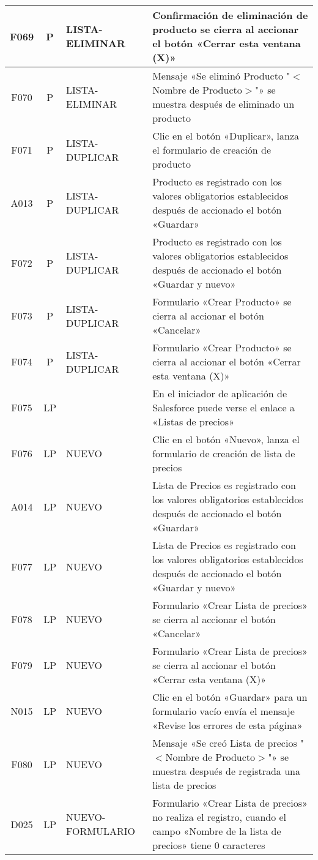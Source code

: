 \begin{landscape}
{\begin{longtable}[htb]{|c|c|p{5.0cm}|p{14.0cm}|}
F069 & P & LISTA-ELIMINAR & Confirmación de eliminación de producto se cierra al accionar el botón «Cerrar esta ventana (X)» \\ \hline
F070 & P & LISTA-ELIMINAR & Mensaje «Se eliminó Producto "$<$Nombre de Producto$>$"» se muestra después de eliminado un producto \\ \hline
F071 & P & LISTA-DUPLICAR & Clic en el botón «Duplicar», lanza el formulario de creación de producto \\ \hline
A013 & P & LISTA-DUPLICAR & Producto es registrado con los valores obligatorios establecidos después de accionado el botón «Guardar» \\ \hline
F072 & P & LISTA-DUPLICAR & Producto es registrado con los valores obligatorios establecidos después de accionado el botón «Guardar y nuevo» \\ \hline
F073 & P & LISTA-DUPLICAR & Formulario «Crear Producto» se cierra al accionar el botón «Cancelar» \\ \hline
F074 & P & LISTA-DUPLICAR & Formulario «Crear Producto» se cierra al accionar el botón «Cerrar esta ventana (X)» \\ \hline
F075 & LP &  & En el iniciador de aplicación de Salesforce puede verse el enlace a «Listas de precios» \\ \hline
F076 & LP & NUEVO & Clic en el botón «Nuevo», lanza el formulario de creación de lista de precios \\ \hline
A014 & LP & NUEVO & Lista de Precios es registrado con los valores obligatorios establecidos después de accionado el botón «Guardar» \\ \hline
F077 & LP & NUEVO & Lista de Precios es registrado con los valores obligatorios establecidos después de accionado el botón «Guardar y nuevo» \\ \hline
F078 & LP & NUEVO & Formulario «Crear Lista de precios» se cierra al accionar el botón «Cancelar» \\ \hline
F079 & LP & NUEVO & Formulario «Crear Lista de precios» se cierra al accionar el botón «Cerrar esta ventana (X)» \\ \hline
N015 & LP & NUEVO & Clic en el botón «Guardar» para un formulario vacío envía el mensaje «Revise los errores de esta página» \\ \hline
F080 & LP & NUEVO & Mensaje «Se creó Lista de precios "$<$Nombre de Producto$>$"» se muestra después de registrada una lista de precios \\ \hline
D025 & LP & NUEVO-FORMULARIO & Formulario «Crear Lista de precios» no realiza el registro, cuando el campo «Nombre de la lista de precios» tiene 0 caracteres \\ \hline

\end{longtable}}
\end{landscape}
